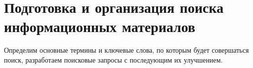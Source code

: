 \section{Подготовка и организация поиска информационных материалов}
Определим основные термины и ключевые слова, по которым будет совершаться поиск, разработаем поисковые запросы с последующим их улучшением.



